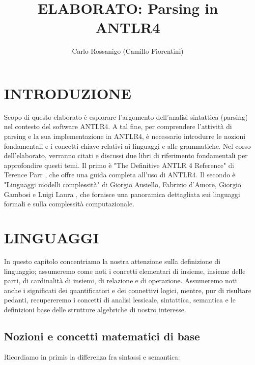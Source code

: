 \documentclass{article}
\title{ELABORATO: Parsing in ANTLR4}
\author{Carlo Rossanigo (Camillo Fiorentini)}
\date{}
\begin{document}
\theoremstyle{definition}
\newtheorem{definition}{Def}[section]
\newtheorem{example}{Esempio}[section]
\newtheorem{teo}{Teorema}[section]
\newtheorem{lemma}{Lemma}[section]
\maketitle

\tableofcontents

\newpage

\section{INTRODUZIONE}
Scopo di questo elaborato è esplorare l'argomento dell'analisi sintattica (parsing) nel contesto del software ANTLR4. A tal fine, per comprendere l'attività di parsing e la sua implementazione in ANTLR4, è necessario introdurre le nozioni fondamentali e i concetti chiave relativi ai linguaggi e alle grammatiche.
\noindent
Nel corso dell'elaborato, verranno citati e discussi due libri di riferimento fondamentali per approfondire questi temi. Il primo è "The Definitive ANTLR 4 Reference" di Terence Parr \cite{parr2013definitive}, che offre una guida completa all'uso di ANTLR4. Il secondo è "Linguaggi modelli complessità" di Giorgio Ausiello, Fabrizio d'Amore, Giorgio Gambosi e Luigi Laura \cite{ausiello2003linguaggi}, che fornisce una panoramica dettagliata sui linguaggi formali e sulla complessità computazionale.

\section{LINGUAGGI}
In questo capitolo concentriamo la nostra attenzione sulla definizione di linguaggio; assumeremo come noti i concetti elementari di insieme, insieme delle parti, di cardinalità di insiemi, di relazione e di operazione. Assumeremo noti anche i significati dei quantificatori e dei connettivi logici, mentre, pur di risultare pedanti, recupereremo i concetti di analisi lessicale, sintattica, semantica e le definizioni base delle strutture algebriche di nostro interesse. 

\subsection{Nozioni e concetti matematici di base}
\noindent
Ricordiamo in primis la differenza fra sintassi e semantica:\newline
\end{document}
